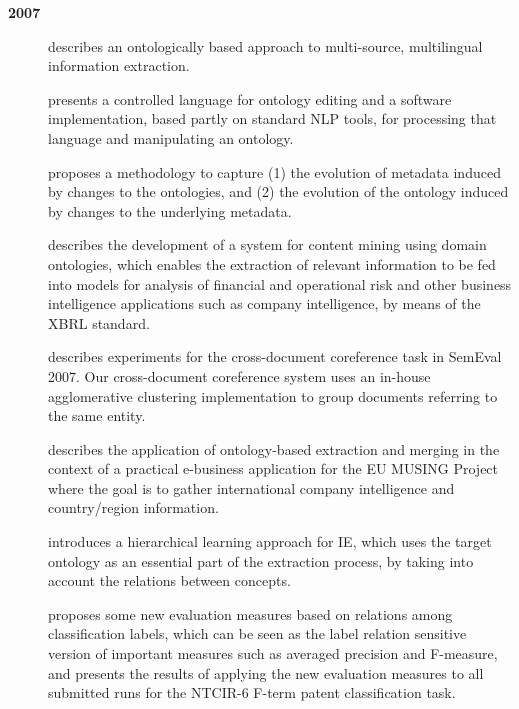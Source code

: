 \textbf{2007}
%
\begin{description}

\item[\cite{Funk07a}] describes an ontologically based approach to multi-source, multilingual information extraction.

\item[\cite{Funk07}] presents a controlled language for ontology editing and
a software implementation, based partly on standard NLP tools,
for processing that language and manipulating an ontology.

\item[\cite{Maynard07b}] proposes a methodology to capture (1) the evolution of metadata induced by changes to the
ontologies, and (2) the evolution of the ontology induced by changes
to the underlying metadata.

\item[\cite{Maynard07a}] describes the development of a
system for content mining using domain ontologies, which enables the
extraction of relevant information to be fed into models for analysis of
financial and operational risk and other business intelligence applications
such as company intelligence, by means of the XBRL standard.


\item[\cite{Saggion'07a}] describes experiments for the cross-document coreference task in SemEval 2007. Our cross-document coreference system uses an in-house agglomerative clustering implementation to group documents referring to the same entity.

\item[\cite{Saggion07}] describes the application of ontology-based extraction
and merging in the context of a practical e-business application for
the EU MUSING Project where the goal is to gather international
company intelligence and country/region information.


\item[\cite{Yaoyong07}] introduces a hierarchical learning approach for IE, which uses the target ontology as an essential part of the extraction process, by taking into account the relations between concepts.

\item[\cite{Yaoyong07a}] proposes some new evaluation measures based on relations among classification labels, which can be seen as the label relation sensitive version of important measures such as averaged precision and F-measure, and presents the results of applying the new evaluation measures to all submitted runs for the NTCIR-6 F-term patent classification task.


\end{description}

